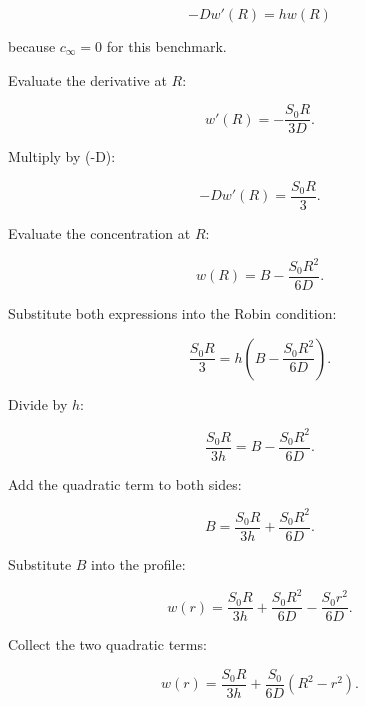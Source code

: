 \documentclass[11pt,a4paper]{article}
\begin{document}
\begin{equation}
-Dw'(R)=hw(R)
\tag{TRISO-ANA-121}
\label{eq:triso-ana-121}
\end{equation}

because $c_\infty=0$ for this benchmark.

Evaluate the derivative at $R$:

\begin{equation}
w'(R)
=
-\frac{S_0R}{3D}.
\tag{TRISO-ANA-122}
\label{eq:triso-ana-122}
\end{equation}

Multiply by (-D):

\begin{equation}
-Dw'(R)
=
\frac{S_0R}{3}.
\tag{TRISO-ANA-123}
\label{eq:triso-ana-123}
\end{equation}

Evaluate the concentration at $R$:

\begin{equation}
w(R)
=
B
-
\frac{S_0R^2}{6D}.
\tag{TRISO-ANA-124}
\label{eq:triso-ana-124}
\end{equation}

Substitute both expressions into the Robin condition:

\begin{equation}
\frac{S_0R}{3}
=
h
\left(
B
-
\frac{S_0R^2}{6D}
\right).
\tag{TRISO-ANA-125}
\label{eq:triso-ana-125}
\end{equation}

Divide by $h$:

\begin{equation}
\frac{S_0R}{3h}
=
B
-
\frac{S_0R^2}{6D}.
\tag{TRISO-ANA-126}
\label{eq:triso-ana-126}
\end{equation}

Add the quadratic term to both sides:

\begin{equation}
B
=
\frac{S_0R}{3h}
+
\frac{S_0R^2}{6D}.
\tag{TRISO-ANA-127}
\label{eq:triso-ana-127}
\end{equation}

Substitute $B$ into the profile:

\begin{equation}
w(r)
=
\frac{S_0R}{3h}
+
\frac{S_0R^2}{6D}
-
\frac{S_0r^2}{6D}.
\tag{TRISO-ANA-128}
\label{eq:triso-ana-128}
\end{equation}

Collect the two quadratic terms:

\begin{equation}
\boxed{
w(r)
=
\frac{S_0R}{3h}
+
\frac{S_0}{6D}
\left(
R^2-r^2
\right).
}
\tag{TRISO-ANA-129}
\label{eq:triso-ana-129}
\end{equation}
\end{document}
